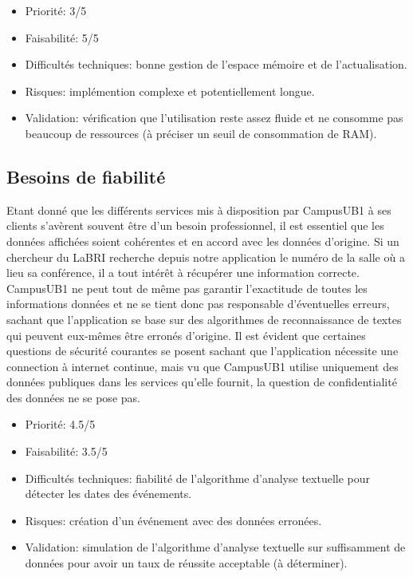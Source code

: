 \documentclass [pdftex,12pt] {report}
\begin{document}
\begin{itemize}
\renewcommand{\labelitemi}{$\bullet$}
\item Priorité: 3/5
\item Faisabilité: 5/5
\item Difficultés techniques: bonne gestion de l'espace mémoire et de l'actualisation.
\item Risques: implémention complexe et potentiellement longue.
\item Validation: vérification que l'utilisation reste assez fluide et ne consomme pas beaucoup de ressources (à préciser un seuil de consommation de RAM).
\end{itemize}  

\subsection{Besoins de fiabilité}
Etant donné que les différents services mis à disposition par CampusUB1 à ses clients s'avèrent souvent être d'un besoin professionnel, il est essentiel que les données affichées soient cohérentes et en accord avec les données d'origine. Si un chercheur du LaBRI recherche depuis notre application le numéro de la salle où a lieu sa conférence, il a tout intérêt à récupérer une information correcte. CampusUB1 ne peut tout de même pas garantir l'exactitude de toutes les informations données et ne se tient donc pas responsable d'éventuelles erreurs, sachant que l'application se base sur des algorithmes de reconnaissance de textes qui peuvent eux-mêmes être erronés d'origine. Il est évident que certaines questions de sécurité courantes se posent sachant que l'application nécessite une connection à internet continue, mais vu que CampusUB1 utilise uniquement des données publiques dans les services qu'elle fournit, la question de confidentialité des données ne se pose pas. \\

\begin{itemize}
\renewcommand{\labelitemi}{$\bullet$}
\item Priorité: 4.5/5
\item Faisabilité: 3.5/5
\item Difficultés techniques: fiabilité de l'algorithme d'analyse textuelle pour détecter les dates des événements.
\item Risques: création d'un événement avec des données erronées.
\item Validation: simulation de l'algorithme d'analyse textuelle sur suffisamment de données pour avoir un taux de réussite acceptable (à déterminer).
\end{itemize}  
\end{document}
